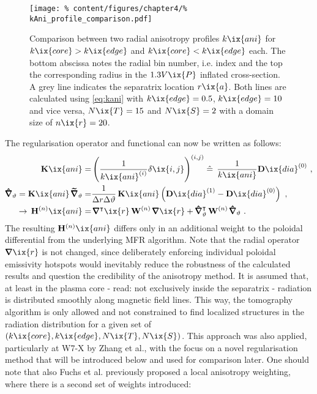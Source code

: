 %
            \begin{figure}[t]%
                \centering%
                \texttt{[image: \%
                    content/figures/chapter4/\%
                    kAni\_profile\_comparison.pdf]}%
                \caption{Comparison between two radial anisotropy profiles $k\ix{ani}$ for $k\ix{core}>k\ix{edge}$ and $k\ix{core}<k\ix{edge}$ each. The bottom abscissa notes the radial bin number, i.e. index and the top the corresponding radius in the $1.3V\ix{P}$ inflated cross-section. A grey line indicates the separatrix location $r\ix{a}$. Both lines are calculated using \cref{eq:kani} with $k\ix{edge}=0.5$, $k\ix{edge}=10$ and vice versa, $N\ix{T}=15$ and $N\ix{S}=2$ with a domain size of $n\ix{r}=20$.}\label{fig:kanicomparison}%
            \end{figure}%
%
            The regularisation operator and functional can now be written as follows:%
%
            \begin{align}%
                \begin{split}%
                    \mathbf{K}\ix{ani}=&\left(\frac{1}{k\ix{ani}^{\left(i\right)}}\delta\ix{i,j}\right)^{\left(i,j\right)}\mathrel{\hat{=}}\,\frac{1}{k\ix{ani}}\mathbf{D}\ix{dia}^{\left(0\right)}\,\,,\\%
                    \pmb{\hat{\nabla}}_{\vartheta}=\mathbf{K}\ix{ani}\,\pmb{\widetilde{\nabla}}_{\vartheta}=&\frac{1}{\Delta r\Delta\vartheta}\,\mathbf{K}\ix{ani}\left(\mathbf{D}\ix{dia}^{\left(1\right)}-\mathbf{D}\ix{dia}^{\left(0\right)}\right)\,\,,\\%
                    \to\,\mathbf{H}^{\left(n\right)}\ix{ani}=&\,\pmb{\nabla}^{\intercal}\ix{r}\,\mathbf{W}^{\left(n\right)}\,\pmb{\nabla}\ix{r}+\pmb{\hat{\nabla}}^{\intercal}_{\vartheta}\,\mathbf{W}^{\left(n\right)}\,\pmb{\hat{\nabla}}_{\vartheta}\,\,.%
                \end{split}\label{eq:anisotropy}%
            \end{align}%
%
            The resulting $\mathbf{H}^{\left(n\right)}\ix{ani}$ differs only in an additional weight to the poloidal differential from the underlying MFR algorithm. Note that the radial operator $\pmb{\nabla}\ix{r}$ is not changed, since deliberately enforcing individual poloidal emissivity hotspots would inevitably reduce the robustness of the calculated results and question the credibility of the anisotropy method. It is assumed that, at least in the plasma core - read: not exclusively inside the separatrix - radiation is distributed smoothly along magnetic field lines. This way, the tomography algorithm is only allowed and not constrained to find localized structures in the radiation distribution for a given set of $\left(k\ix{core},k\ix{edge},N\ix{T},N\ix{S}\right)$. This approach was also applied, particularly at W7-X by Zhang et al.\cite{Zhang2021_2}, with the focus on a novel regularisation method that will be introduced below and used for comparison later. One should note that also Fuchs et al.\cite{Fuchs1994} previously proposed a local anisotropy weighting, where there is a second set of weights introduced:%
